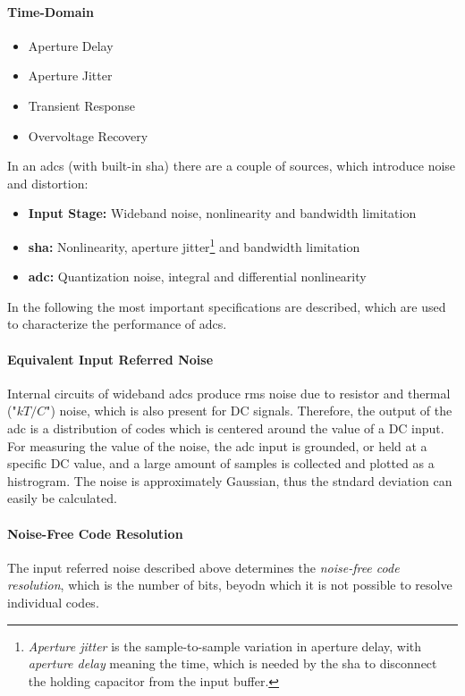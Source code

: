 \paragraph{Time-Domain}
\begin{itemize}
	\item Aperture Delay
	\item Aperture Jitter
	\item Transient Response
	\item Overvoltage Recovery
\end{itemize}


In an \glspl{adc} (with built-in \gls{sha}) there are a couple of sources, which introduce noise and distortion:
\begin{itemize}
	\item \textbf{Input Stage:} Wideband noise, nonlinearity and bandwidth limitation
	\item \textbf{\gls{sha}:} Nonlinearity, aperture jitter\footnote{\textit{Aperture jitter} is the sample-to-sample variation in aperture delay, with \textit{aperture delay} meaning the time, which is needed by the \gls{sha} to disconnect the holding capacitor from the input buffer.} and bandwidth limitation
	\item \textbf{\gls{adc}:} Quantization noise, integral and differential nonlinearity
\end{itemize}
In the following the most important specifications are described, which are used to characterize the performance of \glspl{adc}.



\paragraph{Equivalent Input Referred Noise}
Internal circuits of wideband \glspl{adc} produce rms noise due to resistor and thermal ("$kT/C$") noise, which is also present for DC signals. Therefore, the output of the \gls{adc} is a distribution of codes which is centered around the value of a DC input. For measuring the value of the noise, the \gls{adc} input is grounded, or held at a specific DC value, and a large amount of samples is collected and plotted as a histrogram. The noise is approximately Gaussian, thus the stndard deviation can easily be calculated.

\paragraph{Noise-Free Code Resolution}
The input referred noise described above determines the \textit{noise-free code resolution}, which is the number of bits, beyodn which it is not possible to resolve individual codes.
\cite{walt}



